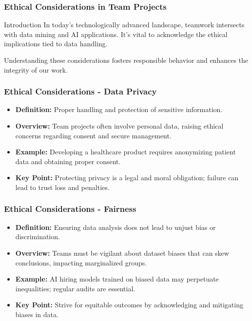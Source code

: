 \documentclass[aspectratio=169]{beamer}
\begin{document}
\begin{frame}[fragile]
    \frametitle{Ethical Considerations in Team Projects}
    \begin{block}{Introduction}
        In today’s technologically advanced landscape, teamwork intersects with data mining and AI applications. It’s vital to acknowledge the ethical implications tied to data handling.
    \end{block}
    Understanding these considerations fosters responsible behavior and enhances the integrity of our work.
\end{frame}

\begin{frame}[fragile]
    \frametitle{Ethical Considerations - Data Privacy}
    \begin{itemize}
        \item \textbf{Definition:} Proper handling and protection of sensitive information.
        \item \textbf{Overview:} Team projects often involve personal data, raising ethical concerns regarding consent and secure management.
        \item \textbf{Example:} Developing a healthcare product requires anonymizing patient data and obtaining proper consent.
        \item \textbf{Key Point:} Protecting privacy is a legal and moral obligation; failure can lead to trust loss and penalties.
    \end{itemize}
\end{frame}

\begin{frame}[fragile]
    \frametitle{Ethical Considerations - Fairness}
    \begin{itemize}
        \item \textbf{Definition:} Ensuring data analysis does not lead to unjust bias or discrimination.
        \item \textbf{Overview:} Teams must be vigilant about dataset biases that can skew conclusions, impacting marginalized groups.
        \item \textbf{Example:} AI hiring models trained on biased data may perpetuate inequalities; regular audits are essential.
        \item \textbf{Key Point:} Strive for equitable outcomes by acknowledging and mitigating biases in data.
    \end{itemize}
\end{frame}
\end{document}
